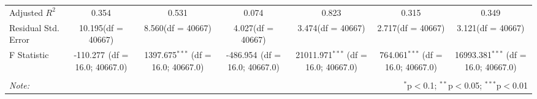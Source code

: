 \begin{table}[!htbp]
\begin{tabular}{@{\extracolsep{5pt}}lcccccc}
 Adjusted $R^2$ & 0.354 & 0.531 & 0.074 & 0.823 & 0.315 & 0.349 \\
 Residual Std. Error & 10.195(df = 40667) & 8.560(df = 40667) & 4.027(df = 40667) & 3.474(df = 40667) & 2.717(df = 40667) & 3.121(df = 40667)  \\
 F Statistic & -110.277$^{}$ (df = 16.0; 40667.0) & 1397.675$^{***}$ (df = 16.0; 40667.0) & -486.954$^{}$ (df = 16.0; 40667.0) & 21011.971$^{***}$ (df = 16.0; 40667.0) & 764.061$^{***}$ (df = 16.0; 40667.0) & 16993.381$^{***}$ (df = 16.0; 40667.0) \\
\hline
\hline \\[-1.8ex]
\textit{Note:} & \multicolumn{6}{r}{$^{*}$p$<$0.1; $^{**}$p$<$0.05; $^{***}$p$<$0.01} \\
\end{tabular}
\end{table}